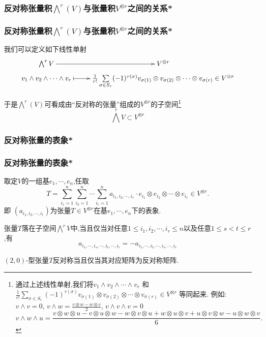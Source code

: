 \subsubsection{反对称张量积$\bigwedge^r(V)$与张量积$V^{\otimes r}$之间的关系*}
\begin{frame}\frametitle{反对称张量积$\bigwedge^r(V)$与张量积$V^{\otimes r}$之间的关系*}
我们可以定义如下线性单射
\begin{equation*}
\xymatrix@R=0mm{
\bigwedge^rV \ar[r] & V^{\otimes r}\\
v_1\wedge v_2\wedge \cdots \wedge v_r \ar@{|->}[r]
& \frac1{r!}\sum\limits_{\sigma\in S_r} (-1)^{\tau(\sigma)} v_{\sigma(1)}\otimes v_{\sigma(2)} \otimes \cdots \otimes v_{\sigma(r)} \in V^{\otimes r}
}
\end{equation*}

于是$\bigwedge^r(V)$可看成由``反对称的张量''组成的$V^{\otimes r}$的子空间\footnote{通过上述线性单射,我们将$v_1\wedge v_2\wedge \cdots \wedge v_r$ 和
$\frac1{r!}\sum\limits_{\sigma\in S_r} (-1)^{\tau(\sigma)} v_{\sigma(1)}\otimes v_{\sigma(2)} \otimes \cdots \otimes v_{\sigma(r)} \in V^{\otimes r}$ 等同起来. 例如: $v \wedge v = 0$, $v \wedge w = \frac{v\otimes w - w\otimes v}{2}$, $v\wedge v\wedge v =0$
{\footnotesize
\begin{equation*}
v\wedge w\wedge u =\frac{v\otimes w \otimes u - v\otimes u \otimes w - w\otimes v \otimes u +  w\otimes u \otimes v + u\otimes v \otimes w - u\otimes w \otimes v }{6}.
\end{equation*}}}\\

\[\bigwedge^r V\subset V^{\otimes r}\]

\end{frame}





\subsubsection{反对称张量的表象*}
\begin{frame}\frametitle{反对称张量的表象*}
取定$V$的一组基$e_1,\cdots,e_n$,任取
\[T = \sum_{i_1=1}^{n}\sum_{i_2=1}^{n}\cdots\sum_{i_r=1}^{n} a_{i_1,i_2,\cdots,i_r} \cdot e_{i_1}\otimes e_{i_2}\otimes \cdots \otimes e_{i_r}\in V^{\otimes r}.\]
即 $(a_{i_1,i_2,\cdots,i_r})$为张量$T\in V^{\otimes r}$在基$e_1,\cdots,e_n$下的表象.
\begin{proposition}
张量$T$落在子空间$\bigwedge^rV$中,当且仅当对任意$1\leq i_1,i_2,\cdots,i_r\leq n$以及任意$1\leq s<t\leq r$ ,有
\[a_{i_1,\cdots,i_s,\cdots,i_t,\cdots,i_r} = - a_{i_1,\cdots,i_t,\cdots,i_s,\cdots,i_r}\]
\end{proposition}
\begin{example}
$(2,0)$-型张量$T$反对称当且仅当其对应矩阵为反对称矩阵.
\end{example}
\end{frame}



